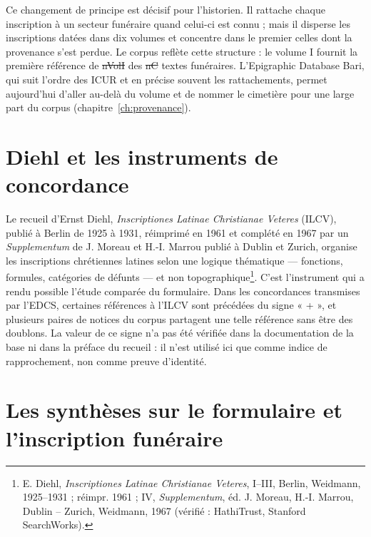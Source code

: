 Ce changement de principe est décisif pour l’historien. Il rattache chaque inscription à un secteur funéraire quand celui-ci est connu ; mais il disperse les inscriptions datées dans dix volumes et concentre dans le premier celles dont la provenance s’est perdue. Le corpus reflète cette structure : le volume I fournit la première référence de \st{nVolI} des \st{nC} textes funéraires. L’Epigraphic Database Bari, qui suit l’ordre des ICUR et en précise souvent les rattachements, permet aujourd’hui d’aller au-delà du volume et de nommer le cimetière pour une large part du corpus (chapitre~\ref{ch:provenance}).

\section{Diehl et les instruments de concordance}

Le recueil d’Ernst Diehl, \emph{Inscriptiones Latinae Christianae Veteres} (ILCV), publié à Berlin de 1925 à 1931, réimprimé en 1961 et complété en 1967 par un \emph{Supplementum} de J. Moreau et H.-I. Marrou publié à Dublin et Zurich, organise les inscriptions chrétiennes latines selon une logique thématique — fonctions, formules, catégories de défunts — et non topographique\footnote{E. Diehl, \emph{Inscriptiones Latinae Christianae Veteres}, I–III, Berlin, Weidmann, 1925–1931 ; réimpr. 1961 ; IV, \emph{Supplementum}, éd. J. Moreau, H.-I. Marrou, Dublin – Zurich, Weidmann, 1967 (vérifié : HathiTrust, Stanford SearchWorks).}. C’est l’instrument qui a rendu possible l’étude comparée du formulaire. Dans les concordances transmises par l’EDCS, certaines références à l’ILCV sont précédées du signe « + », et plusieurs paires de notices du corpus partagent une telle référence sans être des doublons. La valeur de ce signe n’a pas été vérifiée dans la documentation de la base ni dans la préface du recueil : il n’est utilisé ici que comme indice de rapprochement, non comme preuve d’identité.

\section{Les synthèses sur le formulaire et l’inscription funéraire}

